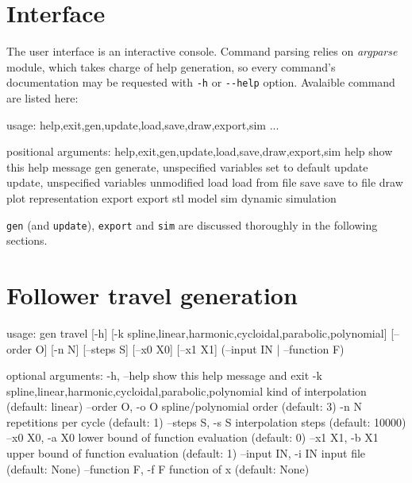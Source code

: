 \documentclass[a4paper,10pt,twoside]{article}
\renewenvironment{verbatim}{\begin{minipage}{\linewidth}\begin{oldverbatim}}{\end{oldverbatim}\end{minipage}}
\begin{document}
\section{Interface}
    The user interface is an interactive console.
    Command parsing relies on \emph{argparse} module, which takes charge of
    help generation, so every command's documentation may be requested with
    \texttt{-h} or \texttt{-\/-help} option. Avalaible command are listed here:

    \begin{verbatim}
    usage: {help,exit,gen,update,load,save,draw,export,sim} ...

    positional arguments:
      {help,exit,gen,update,load,save,draw,export,sim}
        help                show this help message
        gen                 generate, unspecified variables set to default
        update              update, unspecified variables unmodified
        load                load from file
        save                save to file
        draw                plot representation
        export              export stl model
        sim                 dynamic simulation
    \end{verbatim}

    \texttt{gen} (and \texttt{update}), \texttt{export} and \texttt{sim} are
    discussed thoroughly in the following sections.

\section{Follower travel generation}
    \begin{verbatim}
    usage: gen travel [-h] [-k {spline,linear,harmonic,cycloidal,parabolic,polynomial}]
                      [--order O] [-n N] [--steps S] [--x0 X0] [--x1 X1]
                      (--input IN | --function F)

    optional arguments:
      -h, --help            show this help message and exit
      -k {spline,linear,harmonic,cycloidal,parabolic,polynomial}
                            kind of interpolation (default: linear)
      --order O, -o O       spline/polynomial order (default: 3)
      -n N                  repetitions per cycle (default: 1)
      --steps S, -s S       interpolation steps (default: 10000)
      --x0 X0, -a X0        lower bound of function evaluation (default: 0)
      --x1 X1, -b X1        upper bound of function evaluation (default: 1)
      --input IN, -i IN     input file (default: None)
      --function F, -f F    function of x (default: None)
    \end{verbatim}
\end{document}
